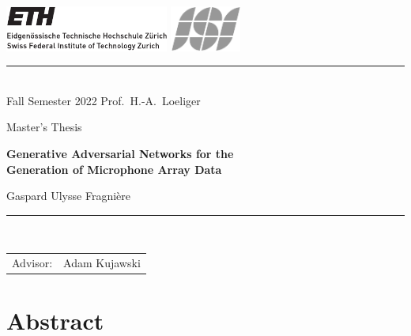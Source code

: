 \documentclass[11pt,a4paper,twoside]{report}
\begin{document}
\pagestyle{plain}
\lfoot{}
\cfoot{\thepage}
\rfoot{}
     
\begin{titlepage}
  \begin{center}
    \includegraphics[height=15mm]{resources/ethlogo} 
    \hfill
    \includegraphics[height=15mm]{resources/isilogo_plain_bw}

    \rule{\textwidth}{0.5pt}\\[1ex]
    {\Large Fall Semester 2022 \hfill 
      Prof.~H.-A.~Loeliger
    }

    \LARGE
    Master's Thesis

    \Huge\textbf{
        Generative Adversarial Networks for the\\
        Generation of Microphone Array Data
    }

    
    \LARGE{
      Gaspard Ulysse Fragnière
    }
    
  \end{center}
  \rule{\textwidth}{0.5pt}\\[2ex]
  \noindent
  \begin{tabular}{@{}ll@{}}
    \Large Advisor: & \Large Adam Kujawski\\[1ex]
  \end{tabular}
\end{titlepage}


\cleardoublepage

\thispagestyle{empty}
\chapter*{Abstract}
\end{document}
